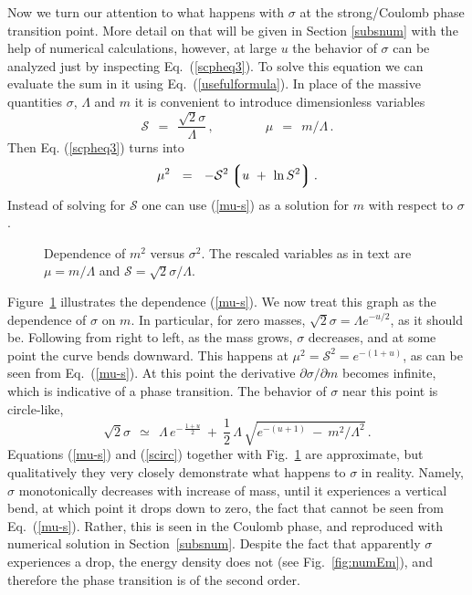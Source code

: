 \documentclass[epsfig,12pt]{article}
\def\beq{\begin{equation}}
\def\eeq{\end{equation}}
\newcommand{\cs}{{\mathcal S}}
\def\beq{\begin{equation}}
\def\eeq{\end{equation}}
\newcommand{\p}{\partial}
\newcommand{\lgr}{\left\lgroup}
\newcommand{\rgr}{\right\rgroup}
\begin{document}
{%

Now we turn our attention to what happens with $\sigma $ at the strong/Coulomb
phase transition point.
More detail on that will be given in Section \ref{subsnum} with the help
of numerical calculations, however, at large $u$ the behavior of $\sigma$ can be analyzed 
just by inspecting Eq.~(\ref{scpheq3}). 
To solve this equation we can evaluate the sum in it using Eq.~(\ref{usefulformula}).
In place of the massive quantities $ \sigma $, $\Lambda $ and $ m $ it is convenient to 
introduce dimensionless variables
\beq
	\cs ~~=~~ \frac{\sqrt{2} \sigma}{\Lambda}\,, \qquad\qquad
        \mu ~~=~~ m/\Lambda\,.
\label{csdef}
\eeq
Then Eq. (\ref{scpheq3}) turns into
\beq
\label{mu-s}
	\mu^2  ~~=~~ - \cs^2 \lgr u  ~+~ \ln S^2 \rgr .
\eeq
Instead of solving for $ \cs $ one can use (\ref{mu-s}) as a solution for $ m $ with respect 
to $ \sigma $.
\begin{figure}
\centerline{\resizebox{11cm}{!}{}}
\caption{\small Dependence of $m^2$ versus $\sigma^2$. The rescaled variables as in text are
$\mu = m/\Lambda$ and $\cs = \sqrt{2}\sigma/\Lambda$. }
\label{fig:mus}
\end{figure}
Figure~\ref{fig:mus} illustrates the dependence (\ref{mu-s}). 
We now treat this graph as the dependence of $ \sigma $ on  $m$.
In particular, for zero masses, $ \sqrt{2}\sigma = \Lambda e^{-u/2} $, as it should be.
Following from right to left, as the mass grows, $ \sigma $ decreases, and at some point 
the curve bends downward. 
This happens at $ \mu^2 = \cs^2 = e^{-(1+u)}$, as can be seen from Eq.~(\ref{mu-s}). 
At this point the derivative $ \p\sigma/\p m $ becomes infinite, which is indicative of a
phase transition. 
The behavior of $ \sigma $ near this point is circle-like,
\beq
\label{scirc}
	\sqrt{2}\sigma ~~\simeq~~ \Lambda\, e^{-\, \frac{1+u}{2}}  ~+~ 
		\frac{1}{2}\,\Lambda\, \sqrt{e^{- (u+1)} ~-~ m^2/\Lambda^2 } \,.
\eeq
Equations (\ref{mu-s}) and  (\ref{scirc}) together with Fig.~\ref{fig:mus} are approximate, but qualitatively
they very closely demonstrate what happens to $ \sigma $ in reality. 
Namely, $ \sigma $ monotonically decreases with increase of mass, 
until it experiences a vertical bend, at which point
it drops down to zero, the fact that cannot be seen from Eq.~(\ref{mu-s}). 
Rather, this is seen in the Coulomb phase, and reproduced with numerical solution in Section~\ref{subsnum}.
Despite the fact that apparently $ \sigma $ experiences a drop, the energy density does not
(see Fig.~\ref{fig:numEm}), and therefore the phase transition is of the second order. 

}
\end{document}
